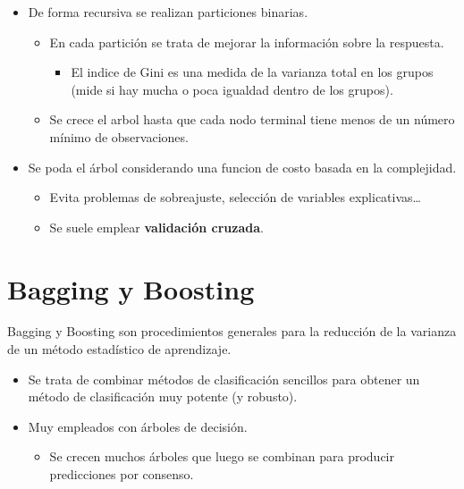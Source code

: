 \documentclass[]{book}
\providecommand{\tightlist}{%
  \setlength{\itemsep}{0pt}\setlength{\parskip}{0pt}}
\begin{document}
\begin{itemize}
\item
  De forma recursiva se realizan particiones binarias.

  \begin{itemize}
  \item
    En cada partición se trata de mejorar la información sobre la
    respuesta.

    \begin{itemize}
    \tightlist
    \item
      El indice de Gini es una medida de la varianza total en los
      grupos (mide si hay mucha o poca igualdad dentro de los
      grupos).
    \end{itemize}
  \item
    Se crece el arbol hasta que cada nodo terminal tiene menos de un
    número mínimo de observaciones.
  \end{itemize}
\item
  Se poda el árbol considerando una funcion de costo basada en la
  complejidad.

  \begin{itemize}
  \item
    Evita problemas de sobreajuste, selección de variables
    explicativas\ldots{}
  \item
    Se suele emplear \textbf{validación cruzada}.
  \end{itemize}
\end{itemize}

\hypertarget{bagging-y-boosting}{%
\section{Bagging y Boosting}\label{bagging-y-boosting}}

Bagging y Boosting son procedimientos generales para la reducción de
la varianza de un método estadístico de aprendizaje.

\begin{itemize}
\item
  Se trata de combinar métodos de clasificación sencillos para
  obtener un método de clasificación muy potente (y robusto).
\item
  Muy empleados con árboles de decisión.

  \begin{itemize}
  \tightlist
  \item
    Se crecen muchos árboles que luego se combinan para producir
    predicciones por consenso.
  \end{itemize}
\end{itemize}
\end{document}
